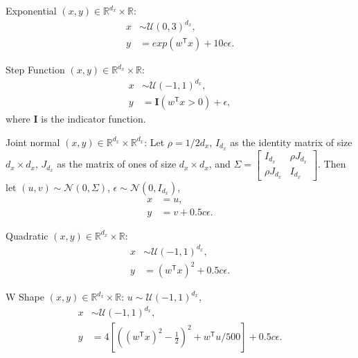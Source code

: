\documentclass[11pt]{article}
\providecommand{\mb}[1]{\boldsymbol{#1}}
\providecommand{\mc}[1]{\mathcal{#1}}
\newcommand{\Real}{\mathbb{R}}
\newcommand{\T}{^{\ensuremath{\mathsf{T}}}}           %
\begin{document}
\begin{compactenum}
%
%
%
%
%
%
%
%
%
%
\item Exponential $(x,y) \in \Real^{d_{x}} \times \Real$: 
\begin{align*}
x &\sim \mc{U}(0,3)^{d_{x}}, \\
y &=exp(w\T x)+10c\epsilon.
\end{align*}
\item Step Function $(x,y) \in \Real^{d_{x}} \times \Real$: 
\begin{align*}
x &\sim \mc{U}(-1,1)^{d_{x}},\\ 
y &=\mb{I}(w\T x>0)+\epsilon,
\end{align*}
where $\mb{I}$ is the indicator function. 
\item Joint normal $(x,y) \in \Real^{d_{x}} \times \Real^{d_{x}}$: Let $\rho=1/2d_{x}$, $I_{d_{x}}$ as the identity matrix of size $d_{x} \times d_{x}$, $J_{d_{x}}$ as the matrix of ones of size $d_{x} \times d_{x}$, and $\Sigma = \begin{bmatrix} I_{d_{x}}&\rho J_{d_{x}}\\ \rho J_{d_{x}}&I_{d_{x}} \end{bmatrix}$. Then let $(u,v) \sim \mc{N}(0, \Sigma)$, $\epsilon \sim \mc{N}(0, I_{d_{x}})$,
\begin{align*}
x &=u,\\ 
y &=v+0.5c\epsilon.
\end{align*}
\item Quadratic $(x,y) \in \Real^{d_{x}} \times \Real$: 
\begin{align*}
x &\sim \mc{U}(-1,1)^{d_{x}},\\
y&=(w\T x)^2+0.5c\epsilon.
\end{align*}
\item W Shape $(x,y) \in \Real^{d_{x}} \times \Real$:  $u \sim \mc{U}(-1,1)^{d_{x}}$,
\begin{align*}
x &\sim \mc{U}(-1,1)^{d_{x}},\\
y&=4\left[ \left( (w\T x)^2 - \tfrac{1}{2} \right)^2 + w\T u/500 \right]+0.5c\epsilon.
\end{align*}

\end{compactenum}
\end{document}
